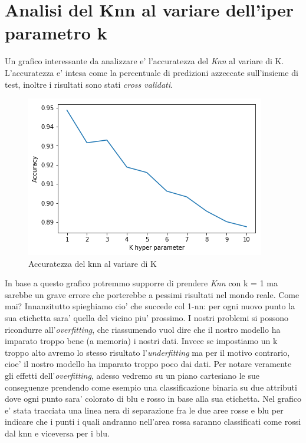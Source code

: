 \section{Analisi del Knn al variare dell'iper parametro k}
Un grafico interessante da analizzare e' l'accuratezza del \textit{Knn} al variare di K. L'accuratezza e' intesa come la percentuale di predizioni azzeccate sull'insieme di test, inoltre i risultati sono stati \textit{cross validati}.
\begin{figure}[H]
	\centering
	\includegraphics[width=0.7\linewidth]{img/accuracy_knn}
	\caption{Accuratezza del knn al variare di K}
	\label{fig:accuracyknn}
\end{figure}
In base a questo grafico potremmo supporre di prendere \textit{Knn} con k = 1 ma sarebbe un grave errore che porterebbe a pessimi risultati nel mondo reale. Come mai? Innanzitutto spieghiamo cio' che succede col 1-nn: per ogni nuovo punto la sua etichetta sara' quella del vicino piu' prossimo. I nostri problemi si possono ricondurre all'\textit{overfitting}, che riassumendo vuol dire che il nostro modello ha imparato troppo bene (a memoria) i nostri dati. Invece se impostiamo un k troppo alto avremo lo stesso risultato l'\textit{underfitting} ma per il motivo contrario, cioe' il nostro modello ha imparato troppo poco dai dati. Per notare veramente gli effetti dell'\textit{overfitting}, adesso vedremo su un piano cartesiano le sue conseguenze prendendo come esempio una classificazione binaria su due attributi dove ogni punto sara' colorato di blu e rosso in base alla sua etichetta. Nel grafico e' stata tracciata una linea nera di separazione fra le due aree rosse e blu per indicare che i punti i quali andranno nell'area rossa saranno classificati come rossi dal knn e viceversa per i blu.

